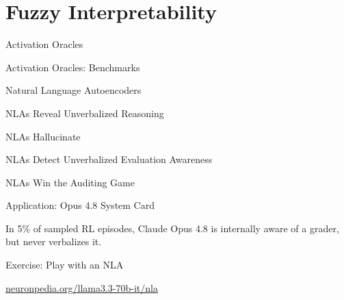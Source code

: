 
\section{Fuzzy Interpretability}

\begin{frame}{Activation Oracles}
\end{frame}

\begin{frame}{Activation Oracles: Benchmarks}
\end{frame}

\begin{frame}{Natural Language Autoencoders}
\end{frame}

\begin{frame}{NLAs Reveal Unverbalized Reasoning}
\end{frame}

\begin{frame}{NLAs Hallucinate}
\end{frame}

\begin{frame}{NLAs Detect Unverbalized Evaluation Awareness}
\end{frame}

\begin{frame}{NLAs Win the Auditing Game}
\end{frame}

\begin{frame}{Application: Opus 4.8 System Card}
\begin{center}
\Large
In 5\% of sampled RL episodes, Claude Opus 4.8 is internally aware of a grader, but never verbalizes it.
\end{center}
\end{frame}

\begin{frame}{Exercise: Play with an NLA}
\begin{center}
\Large
\href{https://www.neuronpedia.org/llama3.3-70b-it/nla}{neuronpedia.org/llama3.3-70b-it/nla}
\end{center}
\end{frame}
